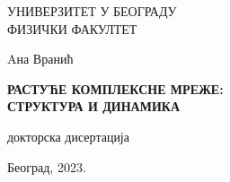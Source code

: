 
\sffamily
{}\selectfont
\thispagestyle{empty}

\begin{center}

\Large{
    УНИВЕРЗИТЕТ У БЕОГРАДУ \\
    ФИЗИЧКИ ФАКУЛТЕТ
}

\vspace{5.5cm}

\Large{
    Aна Вранић
}

\vspace{.5cm}

\LARGE{ \textbf{
    РАСТУЋЕ КОМПЛЕКСНЕ МРЕЖЕ:\\ СТРУКТУРА И ДИНАМИКА
}}

\vspace{.5cm}

\Large{
    докторска дисертација 
    
}
\vspace{9.1cm}
\Large{
    Београд, 2023.
}
\end{center}


\pagebreak
\justify
\thispagestyle{empty}



